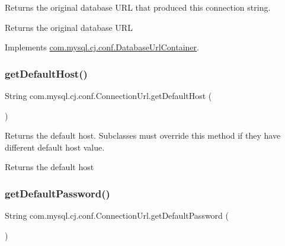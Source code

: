 Returns the original database U\+RL that produced this connection string.

\begin{DoxyReturn}{Returns}
the original database U\+RL 
\end{DoxyReturn}


Implements \mbox{\hyperlink{interfacecom_1_1mysql_1_1cj_1_1conf_1_1_database_url_container_a5a2570fc547da50c4d8f0486de2fb13e}{com.\+mysql.\+cj.\+conf.\+Database\+Url\+Container}}.

\mbox{\label{classcom_1_1mysql_1_1cj_1_1conf_1_1_connection_url_a642faf5647403f81ccc6bd07d7a142b3}} 
\subsubsection{\texorpdfstring{get\+Default\+Host()}{getDefaultHost()}}
{\footnotesize\ttfamily String com.\+mysql.\+cj.\+conf.\+Connection\+Url.\+get\+Default\+Host (\begin{DoxyParamCaption}{ }\end{DoxyParamCaption})}

Returns the default host. Subclasses must override this method if they have different default host value.

\begin{DoxyReturn}{Returns}
the default host 
\end{DoxyReturn}
\mbox{\label{classcom_1_1mysql_1_1cj_1_1conf_1_1_connection_url_a2bbd7c56d39042e376fbdc28eff508e5}} 
\subsubsection{\texorpdfstring{get\+Default\+Password()}{getDefaultPassword()}}
{\footnotesize\ttfamily String com.\+mysql.\+cj.\+conf.\+Connection\+Url.\+get\+Default\+Password (\begin{DoxyParamCaption}{ }\end{DoxyParamCaption})}

